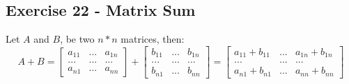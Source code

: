 \documentclass[12pt]{article}
\begin{document}
\subsection*{Exercise 22 - Matrix Sum}
Let $A$ and $B$, be two $n*n$ matrices, then:
\[ A+B = 
  \begin{bmatrix} 
    a_{11} & ... & a_{1n} \\ 
    ... & ... & ... \\
    a_{n1} & ... & a_{nn} 
  \end{bmatrix} + 
  \begin{bmatrix} 
    b_{11} & ... & b_{1n} \\ 
    ... & ... & ... \\
    b_{n1} & ... & b_{nn} 
  \end{bmatrix} =
  \begin{bmatrix} 
    a_{11} + b_{11}  & ... & a_{1n} + b_{1n} \\ 
    ... & ... & ... \\
    a_{n1} + b_{n1}  & ... & a_{nn} + b_{nn} 
  \end{bmatrix}  
\]
\end{document}
